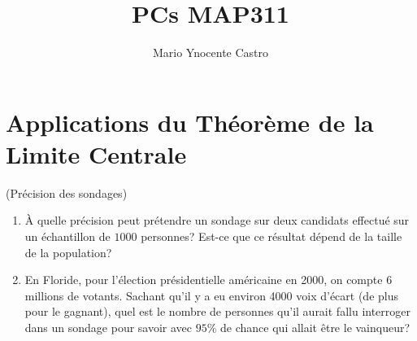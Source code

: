 \documentclass[10pt,a4paper,oneside]{article}
\newenvironment{exercice}[1][Exercice]{\begin{trivlist}
\item[\hskip \labelsep {\bfseries #1}]}{\end{trivlist}}
\begin{document}
\title{PCs MAP311}
\author{Mario Ynocente Castro}

\maketitle

\section{Applications du Théorème de la Limite Centrale}

\begin{exercice} (Précision des sondages)

\begin{enumerate}
\item
À quelle précision peut prétendre un sondage sur deux candidats effectué sur un échantillon de $1000$ personnes? Est-ce que ce résultat dépend de la taille de la population?

\item
En Floride, pour l'élection présidentielle américaine en 2000, on compte 6 millions de votants. Sachant qu'il y a eu environ 4000 voix d'écart (de plus pour le gagnant), quel est le nombre de personnes qu'il aurait fallu interroger dans un sondage pour savoir avec $95\%$ de chance qui allait être le vainqueur?

\end{enumerate}

\end{exercice}
\end{document}
